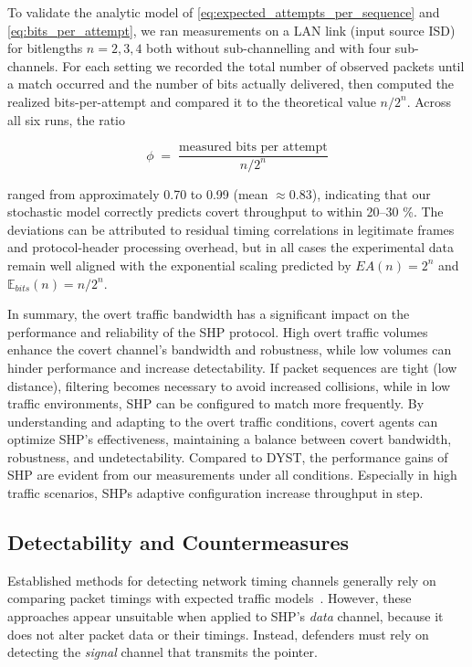 \documentclass[journal]{IEEEtran}
\begin{document}
To validate the analytic model of \eqref{eq:expected_attempts_per_sequence} and \eqref{eq:bits_per_attempt}, we ran measurements on a LAN link (input source ISD) for bitlengths \(n\!=\!2,3,4\) both without sub-channelling and with four sub-channels.  For each setting we recorded the total number of observed packets until a match occurred and the number of bits actually delivered, then computed the realized bits-per-attempt and compared it to the theoretical value \(n/2^n\).  Across all six runs, the ratio  

\begin{equation}
\label{eq:phi}
\phi \;=\; \frac{\text{measured bits per attempt}}{n/2^n}
\end{equation}

ranged from approximately 0.70 to 0.99 (mean \(\approx0.83\)), indicating that our stochastic model correctly predicts covert throughput to within 20–30 \%.  The deviations can be attributed to residual timing correlations in legitimate frames and protocol-header processing overhead, but in all cases the experimental data remain well aligned with the exponential scaling predicted by \(EA(n)=2^n\) and \(\mathbb{E}_{bits}(n)=n/2^n\).

In summary, the overt traffic bandwidth has a significant impact on the performance and reliability of the \ac{SHP} protocol. High overt traffic volumes enhance the covert channel's bandwidth and robustness, while low volumes can hinder performance and increase detectability. If packet sequences are tight (low distance), filtering becomes necessary to avoid increased collisions, while in low traffic environments, \ac{SHP} can be configured to match more frequently. By understanding and adapting to the overt traffic conditions, covert agents can optimize \ac{SHP}'s effectiveness, maintaining a balance between covert bandwidth, robustness, and undetectability. Compared to \ac{DYST}, the performance gains of SHP are evident from our measurements under all conditions. Especially in high traffic scenarios, \ac{SHP}s adaptive configuration increase throughput in step.

\subsection{Detectability and Countermeasures}
Established methods for detecting network timing channels generally rely on comparing packet timings with expected traffic models~\cite{detect_ipd19,NIHBook,cabuk09}. However, these approaches appear unsuitable when applied to \ac{SHP}'s \emph{data} channel, because it does not alter packet data or their timings. Instead, defenders must rely on detecting the \emph{signal} channel that transmits the pointer.
\end{document}
